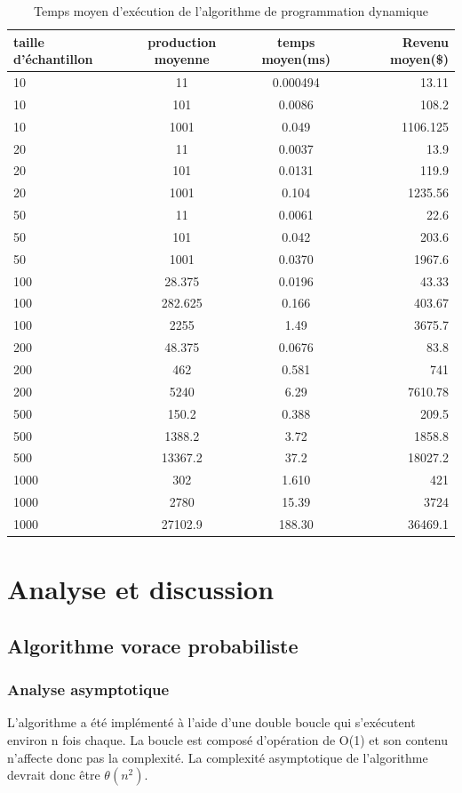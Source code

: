 \documentclass[a4paper, 12pt]{article} %
\begin{document}
\begin{table}[H]
\caption{Temps moyen d'exécution de l'algorithme de programmation dynamique}
\centering
\begin{tabular}{| l | c | c | r |}
\hline
taille d'échantillon & production moyenne & temps moyen(ms)  & Revenu moyen(\$)\\
\hline
10 & 11 & 0.000494 & 13.11\\
\hline
10 & 101 & 0.0086 & 108.2\\
\hline
10 & 1001 & 0.049 & 1106.125\\
\hline
20 & 11 & 0.0037 & 13.9\\
\hline
20 & 101 & 0.0131 & 119.9\\
\hline
20 & 1001 & 0.104 & 1235.56\\
\hline
50 & 11 & 0.0061 & 22.6\\
\hline
50 & 101 & 0.042 & 203.6\\
\hline
50 & 1001 & 0.0370 & 1967.6\\
\hline
100 & 28.375 & 0.0196 & 43.33\\
\hline
100 & 282.625 & 0.166 & 403.67\\
\hline
100 & 2255 & 1.49 & 3675.7\\
\hline
200 & 48.375 & 0.0676 & 83.8\\
\hline
200 & 462 & 0.581 & 741\\
\hline
200 & 5240 & 6.29 & 7610.78\\
\hline
500 & 150.2 & 0.388 & 209.5\\
\hline
500 & 1388.2 & 3.72 & 1858.8\\
\hline
500 & 13367.2 & 37.2 & 18027.2\\
\hline
1000 & 302 & 1.610 & 421\\
\hline
1000 & 2780 & 15.39 & 3724\\
\hline
1000 & 27102.9 & 188.30 & 36469.1\\
\hline
\end{tabular}
\end{table}
\section*{Analyse et discussion}
\subsection*{Algorithme vorace probabiliste}
\subsubsection*{Analyse asymptotique}
L'algorithme a été implémenté à l'aide d'une double boucle qui s'exécutent environ n fois chaque. La boucle est composé d'opération de O(1) et son contenu n'affecte donc pas la complexité. La complexité asymptotique de l'algorithme devrait donc être $\theta(n^{2})$.
\end{document}
